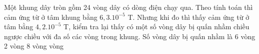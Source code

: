 \begin{vidu} %
Một khung dây tròn gồm 24 vòng dây có dòng điện chạy qua. Theo tính toán thì cảm ứng từ ở tâm khung bằng $6,3.10^{-5}$ T. Nhưng khi đo thì thấy cảm ứng từ ở tâm bằng $4,2.10^{-5}$ T, kiểm tra lại thấy có một số vòng dây bị quấn nhầm chiều ngược chiều với đa số các vòng trong khung. Số vòng dây bị quấn nhầm là
\choice
{6 vòng}
{2 vòng}
{8 vòng}
{ vòng}
\end{vidu}
